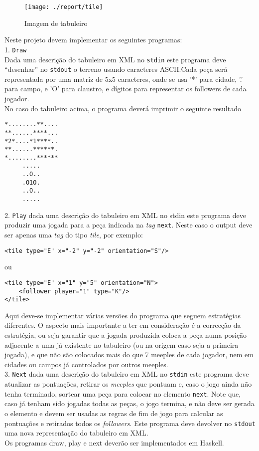 
\begin{figure}[H]
  \caption{Imagem de tabuleiro}
  \centering 
    \texttt{[image: ./report/tile]}
\end{figure}

Neste projeto devem implementar os seguintes programas:\\
 1. \texttt{Draw}\\
Dada uma descrição do tabuleiro em XML no \texttt{stdin} este programa deve
“desenhar” no \texttt{stdout} o terreno usando caracteres ASCII.Cada peça será
representada por uma matriz de 5x5 caracteres, onde se usa '*' para cidade, '.'
para campo, e 'O' para claustro, e dígitos para representar os followers de
cada jogador.\\

No caso do tabuleiro acima, o programa deverá imprimir o seguinte
resultado
\begin{verbatim}
*........**....
**......****...
*2*....*1****..
**......******.
*........******
     .....     
     ..O..     
     .O1O.     
     ..O..     
     .....     
\end{verbatim}

2. \texttt{Play} dada uma descrição do tabuleiro em XML no stdin este programa deve produzir uma jogada
para a peça indicada na \emph{tag} \texttt{next}. Neste caso o output deve ser apenas uma \emph{tag} do tipo
\emph{tile}, por exemplo:

\begin{verbatim}
<tile type="E" x="-2" y="-2" orientation="S"/>
\end{verbatim}

ou

\begin{verbatim}
<tile type="E" x="1" y="5" orientation="N">
    <follower player="1" type="K"/>
</tile>
\end{verbatim}

Aqui deve-se implementar várias versões do programa que seguem estratégias diferentes. O aspecto mais
importante a ter em consideração é a correcção da estratégia, ou seja garantir que a jogada produzida
coloca a peça numa posição adjacente a uma já existente no tabuleiro (ou na origem caso seja a primeira
jogada), e que não são colocados mais do que 7 meeples de cada jogador, nem em cidades ou campos já
controlados por outros meeples.\\

3. \texttt{Next} dada uma descrição do tabuleiro em XML no \texttt{stdin} este programa deve atualizar as
pontuações, retirar os \emph{meeples} que pontuam e, caso o jogo ainda não tenha terminado, sortear uma
peça para colocar no elemento \texttt{next}. Note que, caso já tenham sido jogadas todas as peças, o jogo
termina, e não deve ser gerada o elemento e devem ser usadas as regras de fim de jogo para calcular as
pontuações e retirados todos os \emph{followers}. Este programa deve devolver no \texttt{stdout} uma nova
representação do tabuleiro em XML.\\

Os programas draw, play e next deverão ser implementados em Haskell.

